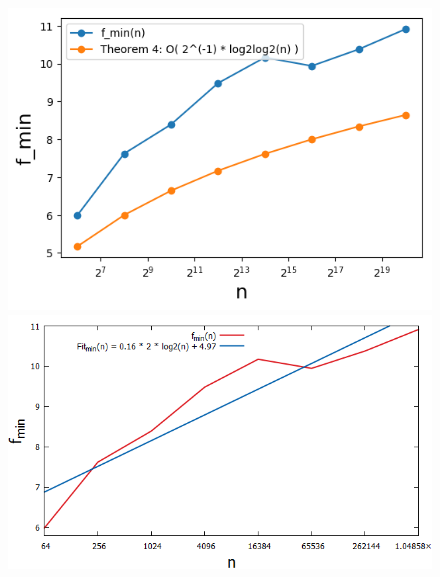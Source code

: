 \begin{figure}[H]
	\hspace*{-1.1cm}
    \begin{minipage}[t]{.30\textwidth}
        \centering
		\includegraphics[width=1.075\textwidth]{pictures/min_theo4_2_min_pred.png}
    \end{minipage}
    \hspace*{0.4cm}
    \begin{minipage}[t]{.30\textwidth}
        \centering
        \includegraphics[width=1.21\textwidth]{pictures/min_theo4_2_fit_min_log.png}
    \end{minipage}
    \hspace*{0.85cm}
    \begin{minipage}[t]{.30\textwidth}
        \centering

\end{minipage}
\end{figure}
